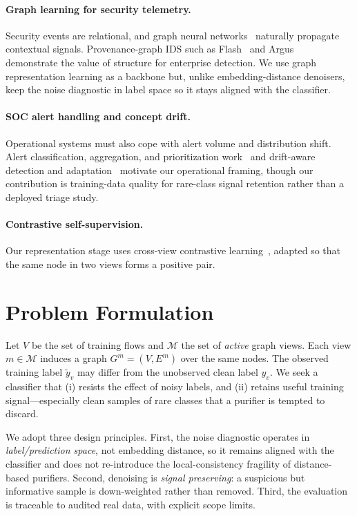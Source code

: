 \documentclass[pdflatex,referee,lineno,sn-basic,Numbered]{sn-jnl}
\begin{document}
\paragraph{Graph learning for security telemetry.}
Security events are relational, and graph neural
networks~\cite{kipf2017gcn,velickovic2018gat,hamilton2017graphsage,hu2020hgt}
naturally propagate contextual signals. Provenance-graph IDS such as
Flash~\cite{rehman2024flash} and Argus~\cite{xu2024argus} demonstrate the value of
structure for enterprise detection. We use graph representation learning as a
backbone but, unlike embedding-distance denoisers, keep the noise diagnostic in
label space so it stays aligned with the classifier.

\paragraph{SOC alert handling and concept drift.}
Operational systems must also cope with alert volume and distribution shift.
Alert classification, aggregation, and prioritization
work~\cite{vaarandi2024nids,chavali2024rlalert,liu2025deepdrac,shon2023semisup,wang2024alertagg}
and drift-aware detection and
adaptation~\cite{yang2021cade,yang2024recda,andresini2021insomnia} motivate our
operational framing, though our contribution is training-data quality for
rare-class signal retention rather than a deployed triage study.

\paragraph{Contrastive self-supervision.}
Our representation stage uses cross-view contrastive
learning~\cite{chen2020simclr}, adapted so that the same node in two views forms a
positive pair.

\section{Problem Formulation}
\label{sec:problem}
Let $V$ be the set of training flows and $\mathcal{M}$ the set of \emph{active}
graph views. Each view $m\in\mathcal{M}$ induces a graph $G^{m}=(V,E^{m})$ over the
same nodes. The observed training label $\tilde{y}_v$ may differ from the
unobserved clean label $y_v$. We seek a classifier that (i) resists the effect of
noisy labels, and (ii) retains useful training signal---especially clean samples
of rare classes that a purifier is tempted to discard.

We adopt three design principles. First, the noise diagnostic operates in
\emph{label/prediction space}, not embedding distance, so it remains aligned with
the classifier and does not re-introduce the local-consistency fragility of
distance-based purifiers. Second, denoising is \emph{signal preserving}: a
suspicious but informative sample is down-weighted rather than removed. Third, the
evaluation is traceable to audited real data, with explicit scope limits.
\end{document}
